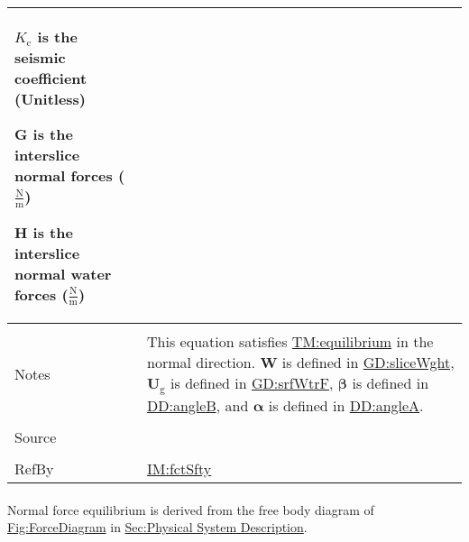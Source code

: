 \documentclass[12pt]{article}
\begin{document}
\begin{minipage}{\textwidth}
\begin{tabular}{>{\raggedright}p{}>{\raggedright\arraybackslash}p{}}
\begin{symbDescription}
              \item{${K_{\text{c}}}$ is the seismic coefficient (Unitless)}
              \item{$\symbf{G}$ is the interslice normal forces ($\frac{\text{N}}{\text{m}}$)}
              \item{$\symbf{H}$ is the interslice normal water forces ($\frac{\text{N}}{\text{m}}$)}
              \end{symbDescription}
\\ \midrule \\
Notes & This equation satisfies \hyperref[TM:equilibrium]{TM:equilibrium} in the normal direction. $\symbf{W}$ is defined in \hyperref[GD:sliceWght]{GD:sliceWght}, ${\symbf{U}_{\text{g}}}$ is defined in \hyperref[GD:srfWtrF]{GD:srfWtrF}, $\symbf{β}$ is defined in \hyperref[DD:angleB]{DD:angleB}, and $\symbf{α}$ is defined in \hyperref[DD:angleA]{DD:angleA}.
        
\\ \midrule \\
Source & \cite{chen2005}
         
\\ \midrule \\
RefBy & \hyperref[IM:fctSfty]{IM:fctSfty}
        
\\ \bottomrule
\end{tabular}
\end{minipage}
\paragraph{}
\label{GD:normForcEqDeriv}
Normal force equilibrium is derived from the free body diagram of \hyperref[Figure:ForceDiagram]{Fig:ForceDiagram} in \hyperref[Sec:PhysSyst]{Sec:Physical System Description}.
\end{document}
